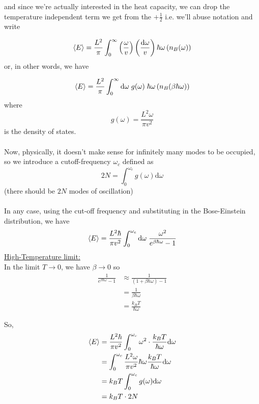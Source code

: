 \documentclass[11pt]{article}
\begin{document}
and since we're actually interested in the heat capacity, we can drop the temperature independent term we get from the $+\frac{1}{2}$ i.e. we'll abuse notation and write 

\begin{align*}
  \langle E \rangle &= \frac{L^2}{\pi} \int_{0}^{\infty} \left(\frac{\omega}{v}\right) \left(\frac{\mathrm{d}\omega}{v}\right) \hbar \omega \left( n_B(\omega)\right) \\
\end{align*} or, in other words, we have 

\begin{align*}
  \langle E \rangle &= \frac{L^2}{\pi} \int_{0}^{\infty}\mathrm{d}\omega \;g(\omega)\; \hbar \omega \left( n_B(\beta \hbar \omega)\right) \\
\end{align*} where $$ g(\omega) = \frac{L^2 \omega}{\pi v^2} $$ is the density of states.
\\
\\
Now, physically, it doesn't make sense for infinitely many modes to be occupied, so we introduce a cutoff-frequency $\omega_c$ defined as $$ 2N = \int_{0}^{\omega_c} g(\omega) \mathrm{d}\omega $$ (there should be $2N$ modes of oscillation)
\\
\\
In any case, using the cut-off frequency and substituting in the Bose-Einstein distribution, we have
$$ \langle E \rangle = \frac{L^2 \hbar}{\pi v^2} \int_{0}^{\omega_c} \mathrm{d}\omega\; \frac{\omega^2}{e^{\beta \hbar \omega} - 1}$$
\underline{High-Temperature limit:}\\
In the limit $T \rightarrow 0$, we have $\beta \rightarrow 0$ so 
\begin{align*}
  \frac{1}{e^{\beta \hbar \omega} - 1} &\approx \frac{1}{\left(1 + \beta \hbar \omega \right) - 1 } \\
  &= \frac{1}{\beta \hbar \omega} \\
  &= \frac{k_B T}{\hbar \omega}
\end{align*}

So, 
\begin{align*}
  \langle E \rangle &= \frac{L^2 \hbar}{\pi v^2} \int_{0}^{\omega_c} \omega^2 \cdot \frac{k_B T}{\hbar \omega} \mathrm{d}\omega \\
  &= \int_{0}^{\omega_c} \frac{L^2 \omega}{\pi v^2} \hbar \omega \frac{k_B T}{\hbar \omega} \mathrm{d}\omega \\
  &= k_B T \int_{0}^{\omega_c} g(\omega) \mathrm{d} \omega \\
  &= k_B T \cdot 2N
\end{align*}
\end{document}
